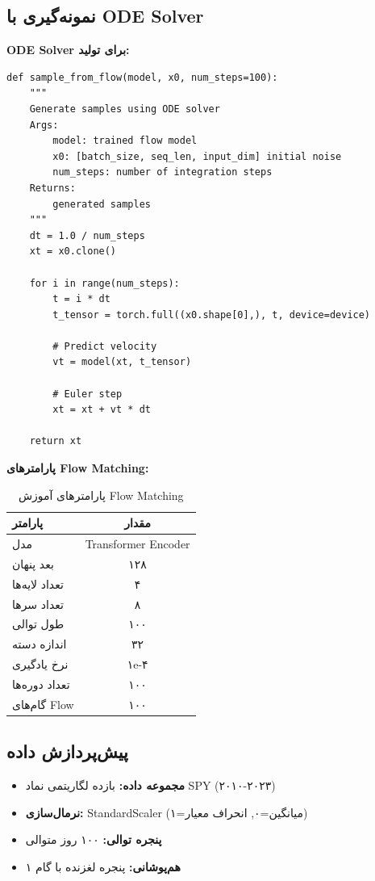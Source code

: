 \subsection{نمونه‌گیری با ODE Solver}

\textbf{ODE Solver برای تولید:}
\begin{verbatim}
def sample_from_flow(model, x0, num_steps=100):
    """
    Generate samples using ODE solver
    Args:
        model: trained flow model
        x0: [batch_size, seq_len, input_dim] initial noise
        num_steps: number of integration steps
    Returns:
        generated samples
    """
    dt = 1.0 / num_steps
    xt = x0.clone()
    
    for i in range(num_steps):
        t = i * dt
        t_tensor = torch.full((x0.shape[0],), t, device=device)
        
        # Predict velocity
        vt = model(xt, t_tensor)
        
        # Euler step
        xt = xt + vt * dt
    
    return xt
\end{verbatim}

\textbf{پارامترهای Flow Matching:}
\begin{table}[H]
    \centering
    \begin{tabular}{lc}
        \toprule
        \textbf{پارامتر} & \textbf{مقدار} \\
        \midrule
        مدل & Transformer Encoder \\
        بعد پنهان & ۱۲۸ \\
        تعداد لایه‌ها & ۴ \\
        تعداد سرها & ۸ \\
        طول توالی & ۱۰۰ \\
        اندازه دسته & ۳۲ \\
        نرخ یادگیری & ۱e-۴ \\
        تعداد دوره‌ها & ۱۰۰ \\
        گام‌های Flow & ۱۰۰ \\
        \bottomrule
    \end{tabular}
    \caption{پارامترهای آموزش Flow Matching}
\end{table}

\subsection{پیش‌پردازش داده}
\begin{itemize}
    \item \textbf{مجموعه داده:} بازده لگاریتمی نماد SPY (۲۰۱۰-۲۰۲۳)
    \item \textbf{نرمال‌سازی:} StandardScaler (میانگین=۰, انحراف معیار=۱)
    \item \textbf{پنجره توالی:} ۱۰۰ روز متوالی
    \item \textbf{هم‌پوشانی:} پنجره لغزنده با گام ۱
\end{itemize}

